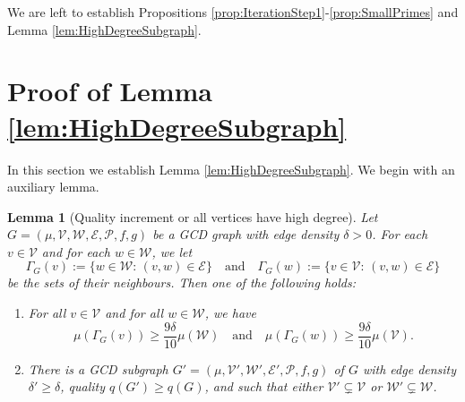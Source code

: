\documentclass[12pt]{amsart}
\numberwithin{equation}{section}
\newtheorem{lem}{Lemma}[section]
\theoremstyle{definition}
\theoremstyle{remark}
\newcommand{\CE}{\mathcal{E}}
\newcommand{\CP}{\mathcal{P}}
\newcommand{\CV}{\mathcal{V}}
\newcommand{\CW}{\mathcal{W}}
\renewcommand{\ge}{\geqslant}
\begin{document}
\medskip

We are left to establish Propositions \ref{prop:IterationStep1}-\ref{prop:SmallPrimes} and Lemma \ref{lem:HighDegreeSubgraph}.


\section{Proof of Lemma \ref{lem:HighDegreeSubgraph}}\label{sec:HighDegree}

In this section we establish Lemma \ref{lem:HighDegreeSubgraph}. We begin with an auxiliary lemma.

\begin{lem}[Quality increment or all vertices have high degree]\label{lem:HighDegree}
Let	$G=(\mu,\CV,\CW,\CE,\CP,f,g)$ be a GCD graph with edge density $\delta>0$. For each $v\in\CV$ and for each $w\in\CW$, we let
\[
\Gamma_G(v):=\{w\in\CW:\,(v,w)\in\CE\}
\quad\text{and}\quad
\Gamma_G(w):=\{v\in\CV:\,(v,w)\in\CE\}
\]
be the sets of their neighbours. Then one of the following holds:
\begin{enumerate}
\item For all $v\in\CV$ and for all $w\in\CW$, we have
\[
\mu(\Gamma_G(v))\ge\frac{9\delta}{10}\mu(\CW)
\quad\text{and}\quad \mu(\Gamma_G(w))\ge\frac{9\delta}{10}\mu(\CV).
\]
\item There is a GCD subgraph $G'=(\mu,\CV',\CW',\CE',\CP,f,g)$ of $G$ with edge density $\delta'\ge \delta$, quality $q(G')\ge q(G)$, and such that either $\CV'\subsetneq\CV$ or $\CW'\subsetneq \CW$.
\end{enumerate}
\end{lem}
\end{document}
